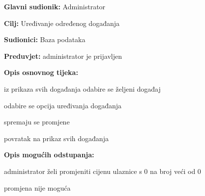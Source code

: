 					\noindent {}
					\begin{packed_item}
	
						\item \textbf{Glavni sudionik: }Administrator
						\item  \textbf{Cilj:} Uređivanje određenog događanja
						\item  \textbf{Sudionici:} Baza podataka
						\item  \textbf{Preduvjet:} administrator je prijavljen
						\item  \textbf{Opis osnovnog tijeka:}
						
						\item[] \begin{packed_enum}
	
							\item iz prikaza svih događanja odabire se željeni događaj
							\item odabire se opcija uređivanja događanja
							\item spremaju se promjene
							\item povratak na prikaz svih događanja
						\end{packed_enum}
						\item  \textbf{Opis mogućih odstupanja:}
						
						\item[] \begin{packed_item}
	
							\item[3.a] administrator želi promjeniti cijenu ulaznice s 0 na broj veći od 0
							\item[] \begin{packed_enum}
								
								\item promjena nije moguća
								
							\end{packed_enum}
						
							
						\end{packed_item}
							
					\end{packed_item}
					

